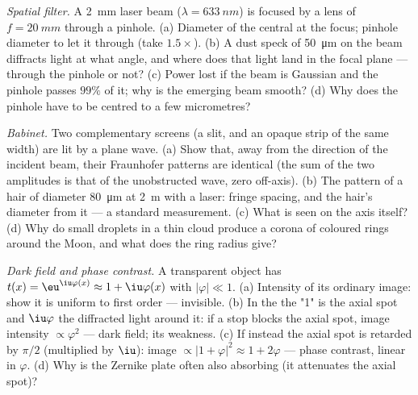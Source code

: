 \begin{exercise}[$\star\star$]\label{exo:b2:diffraction:9}
\emph{Spatial filter.} A \qty{2}{mm} laser beam ($\lambda = \qty{633}{nm}$) is
focused by a lens of $f = \qty{20}{mm}$ through a pinhole. (a) Diameter of
the central  at the focus; pinhole diameter to let it through
(take $1.5\times$). (b) A dust speck of \qty{50}{\micro m} on the beam
diffracts light at what angle, and where does that light land in the
focal plane --- through the pinhole or not? (c) Power lost if the beam
is Gaussian and the pinhole passes $99\%$ of it; why is the emerging
beam smooth? (d) Why does the pinhole have to be centred to a few
micrometres?
\end{exercise}

\begin{exercise}[$\star\star\star$]\label{exo:b2:diffraction:10}
\emph{Babinet.} Two complementary screens (a slit, and an opaque
strip of the same width) are lit by a plane wave. (a) Show that, away
from the direction of the incident beam, their Fraunhofer patterns
are identical (the sum of the two amplitudes is that of the
unobstructed wave, zero off-axis). (b) The pattern of a hair of
diameter \qty{80}{\micro m} at \qty{2}{m} with a laser: fringe spacing, and the
hair's diameter from it --- a standard measurement. (c) What is seen
on the axis itself? (d) Why do small droplets in a thin cloud produce a
corona of coloured rings around the Moon, and what does the ring
radius give?
\end{exercise}

\begin{exercise}[$\star\star\star$]\label{exo:b2:diffraction:11}
\emph{Dark field and phase contrast.} A transparent object has
$t(x) = \eu^{\iu\varphi(x)} \approx 1 + \iu\varphi(x)$ with $|\varphi| \ll 1$. (a) Intensity of
its ordinary image: show it is uniform to first order --- invisible. (b)
In the  the "1" is the axial spot and $\iu\varphi$ the
diffracted light around it: if a stop blocks the axial spot, image
intensity $\propto\varphi^2$ --- dark field; its weakness. (c) If instead the
axial spot is retarded by $\pi/2$ (multiplied by $\iu$): image $\propto|1 +
\varphi|^2 \approx 1 + 2\varphi$ --- phase contrast, linear in $\varphi$. (d) Why is the
Zernike plate often also absorbing (it attenuates the axial spot)?
\end{exercise}

